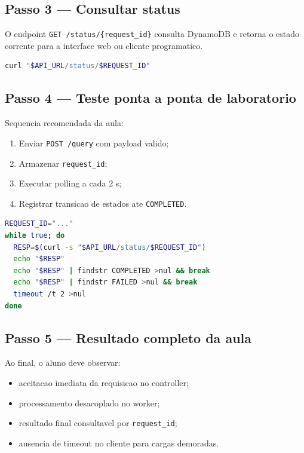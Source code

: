 \subsection{Passo 3 --- Consultar status}

O endpoint \texttt{GET /status/\{request\_id\}} consulta DynamoDB e retorna o
estado corrente para a interface web ou cliente programatico.

\begin{lstlisting}[language=bash,
  caption={Consulta de status no laboratorio.},
  label={lst:status_call}]
curl "$API_URL/status/$REQUEST_ID"
\end{lstlisting}

\subsection{Passo 4 --- Teste ponta a ponta de laboratorio}

Sequencia recomendada da aula:

\begin{enumerate}[leftmargin=*]
  \item Enviar \texttt{POST /query} com payload valido;
  \item Armazenar \texttt{request\_id};
  \item Executar polling a cada 2 s;
  \item Registrar transicao de estados ate \texttt{COMPLETED}.
\end{enumerate}

\begin{lstlisting}[language=bash,
  caption={Script minimo de polling com shell.},
  label={lst:polling_shell}]
REQUEST_ID="..."
while true; do
  RESP=$(curl -s "$API_URL/status/$REQUEST_ID")
  echo "$RESP"
  echo "$RESP" | findstr COMPLETED >nul && break
  echo "$RESP" | findstr FAILED >nul && break
  timeout /t 2 >nul
done
\end{lstlisting}

\subsection{Passo 5 --- Resultado completo da aula}

Ao final, o aluno deve observar:

\begin{itemize}[leftmargin=*]
  \item aceitacao imediata da requisicao no controller;
  \item processamento desacoplado no worker;
  \item resultado final consultavel por \texttt{request\_id};
  \item ausencia de timeout no cliente para cargas demoradas.
\end{itemize}

